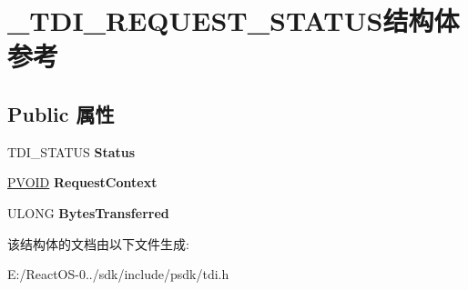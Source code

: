 \hypertarget{struct___t_d_i___r_e_q_u_e_s_t___s_t_a_t_u_s}{}\section{\+\_\+\+T\+D\+I\+\_\+\+R\+E\+Q\+U\+E\+S\+T\+\_\+\+S\+T\+A\+T\+U\+S结构体 参考}
\label{struct___t_d_i___r_e_q_u_e_s_t___s_t_a_t_u_s}
\subsection*{Public 属性}
\begin{DoxyCompactItemize}
\item 
\mbox{\label{struct___t_d_i___r_e_q_u_e_s_t___s_t_a_t_u_s_a37e10c9e1787a743ac16b4905c2c4342}} 
T\+D\+I\+\_\+\+S\+T\+A\+T\+US {\bfseries Status}
\item 
\mbox{\label{struct___t_d_i___r_e_q_u_e_s_t___s_t_a_t_u_s_affc46af0d88de826ccf4490a645854c8}} 
\hyperlink{interfacevoid}{P\+V\+O\+ID} {\bfseries Request\+Context}
\item 
\mbox{\label{struct___t_d_i___r_e_q_u_e_s_t___s_t_a_t_u_s_a428dfb8cca54d2a282ca1f0099a3f063}} 
U\+L\+O\+NG {\bfseries Bytes\+Transferred}
\end{DoxyCompactItemize}


该结构体的文档由以下文件生成\+:\begin{DoxyCompactItemize}
\item 
E\+:/\+React\+O\+S-\/0../sdk/include/psdk/tdi.\+h\end{DoxyCompactItemize}
